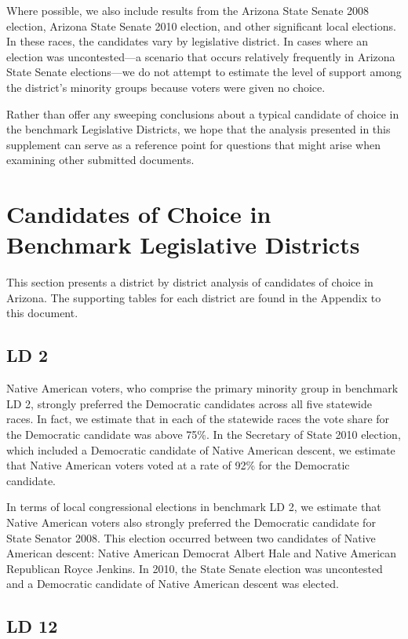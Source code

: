 \documentclass[12pt]{article}
\begin{document}
Where possible, we also include results from the Arizona State Senate
2008 election, Arizona State Senate 2010 election, and other
significant local elections. In these races, the candidates vary by
legislative district. In cases where an election was uncontested---a
scenario that occurs relatively frequently in Arizona State Senate
elections---we do not attempt to estimate the level of support among
the district's minority groups because voters were given no choice.

Rather than offer any sweeping conclusions about a typical candidate
of choice in the benchmark Legislative Districts, we hope that the
analysis presented in this supplement can serve as a reference point
for questions that might arise when examining other submitted
documents.

\section{Candidates of Choice in Benchmark Legislative Districts}

This section presents a district by district analysis of candidates of
choice in Arizona. The supporting tables for each district are found
in the Appendix to this document.

\subsection{LD 2}
Native American voters, who comprise the primary minority group in
benchmark LD 2, strongly preferred the Democratic candidates across
all five statewide races. In fact, we estimate that in each of the
statewide races the vote share for the Democratic candidate was above
75\%. In the Secretary of State 2010 election, which included a
Democratic candidate of Native American descent, we estimate that
Native American voters voted at a rate of 92\% for the Democratic
candidate.

In terms of local congressional elections in benchmark LD 2, we
estimate that Native American voters also strongly preferred the
Democratic candidate for State Senator 2008. This election occurred
between two candidates of Native American descent: Native American
Democrat Albert Hale and Native American Republican Royce Jenkins.
In 2010, the State Senate election was uncontested and a Democratic
candidate of Native American descent was elected.

\subsection{LD 12}
\end{document}
